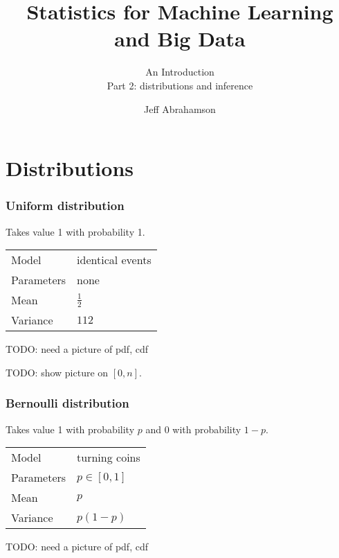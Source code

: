 \documentclass[t]{beamer}
\title
{Statistics for Machine Learning and Big Data}
\subtitle{An Introduction\\[6mm] Part 2: distributions and inference}
\author[Abrahamson] {Jeff Abrahamson}
\begin{document}
\begin{frame}
  \titlepage
\end{frame}

\section{Distributions}

\begin{frame}
  \frametitle{Uniform distribution}

  Takes value 1 with probability 1.
  \bigskip
  
  \begin{tabular}{ll}
    Model & identical events\\[1mm]
    Parameters & none\\[1mm]
    Mean & $\frac 12$\\[1mm]
    Variance & $1{12}$
  \end{tabular}

  TODO: need a picture of pdf, cdf
  
  
  TODO: show picture on $[0,n]$.

\end{frame}
\begin{frame}
  \frametitle{Bernoulli distribution}

  Takes value 1 with probability $p$ and 0 with probability $1-p$.
  \bigskip
  
  \begin{tabular}{ll}
    Model & turning coins\\[1mm]
    Parameters & $p\in [0,1]$\\[1mm]
    Mean & $p$\\[1mm]
    Variance & $p(1-p)$
  \end{tabular}

  TODO: need a picture of pdf, cdf
  
  \note{

  }
  
\end{frame}
\end{document}
